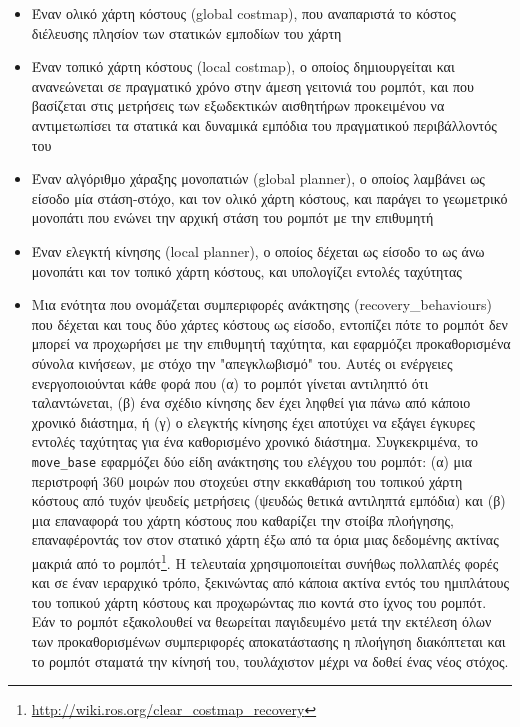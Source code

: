 \begin{itemize}
  \item Έναν ολικό χάρτη κόστους (global costmap), που αναπαριστά το κόστος
        διέλευσης πλησίον των στατικών εμποδίων του χάρτη
  \item Έναν τοπικό χάρτη κόστους (local costmap), ο οποίος δημιουργείται και
        ανανεώνεται σε πραγματικό χρόνο στην άμεση γειτονιά του ρομπότ, και που
        βασίζεται στις μετρήσεις των εξωδεκτικών αισθητήρων προκειμένου να
        αντιμετωπίσει τα στατικά και δυναμικά εμπόδια του πραγματικού
        περιβάλλοντός του
  \item Έναν αλγόριθμο χάραξης μονοπατιών (global planner), ο οποίος λαμβάνει
        ως είσοδο μία στάση-στόχο, και τον ολικό χάρτη κόστους, και παράγει το
        γεωμετρικό μονοπάτι που ενώνει την αρχική στάση του ρομπότ με την
        επιθυμητή
  \item Έναν ελεγκτή κίνησης (local planner), ο οποίος δέχεται ως είσοδο το ως
        άνω μονοπάτι και τον τοπικό χάρτη κόστους, και υπολογίζει εντολές
        ταχύτητας
  \item Μια ενότητα που ονομάζεται συμπεριφορές ανάκτησης (recovery\_behaviours)
        που δέχεται και τους δύο χάρτες κόστους ως είσοδο, εντοπίζει πότε το
        ρομπότ δεν μπορεί να προχωρήσει με την επιθυμητή ταχύτητα, και
        εφαρμόζει προκαθορισμένα σύνολα κινήσεων, με στόχο την "απεγκλωβισμό"
        του. Αυτές οι ενέργειες ενεργοποιούνται κάθε φορά που (α) το ρομπότ
        γίνεται αντιληπτό ότι ταλαντώνεται, (β) ένα σχέδιο κίνησης δεν έχει
        ληφθεί για πάνω από κάποιο χρονικό διάστημα, ή (γ) ο ελεγκτής κίνησης
        έχει αποτύχει να εξάγει έγκυρες εντολές ταχύτητας για ένα καθορισμένο
        χρονικό διάστημα. Συγκεκριμένα, το \texttt{move\_base} εφαρμόζει δύο
        είδη ανάκτησης του ελέγχου του ρομπότ: (α) μια περιστροφή $360$ μοιρών
        που στοχεύει στην εκκαθάριση του τοπικού χάρτη κόστους από τυχόν
        ψευδείς μετρήσεις (ψευδώς θετικά αντιληπτά εμπόδια) και (β) μια
        επαναφορά του χάρτη κόστους που καθαρίζει την στοίβα πλοήγησης,
        επαναφέροντάς τον στον στατικό χάρτη έξω από τα όρια μιας δεδομένης
        ακτίνας μακριά από το
        ρομπότ\footnote{\url{http://wiki.ros.org/clear\_costmap\_recovery}}. Η
        τελευταία χρησιμοποιείται συνήθως πολλαπλές φορές και σε έναν ιεραρχικό
        τρόπο, ξεκινώντας από κάποια ακτίνα εντός του ημιπλάτους του τοπικού
        χάρτη κόστους και προχωρώντας πιο κοντά στο ίχνος του ρομπότ. Εάν το
        ρομπότ εξακολουθεί να θεωρείται παγιδευμένο μετά την εκτέλεση όλων των
        προκαθορισμένων συμπεριφορές αποκατάστασης η πλοήγηση διακόπτεται και
        το ρομπότ σταματά την κίνησή του, τουλάχιστον μέχρι να δοθεί ένας νέος
        στόχος.
\end{itemize}


